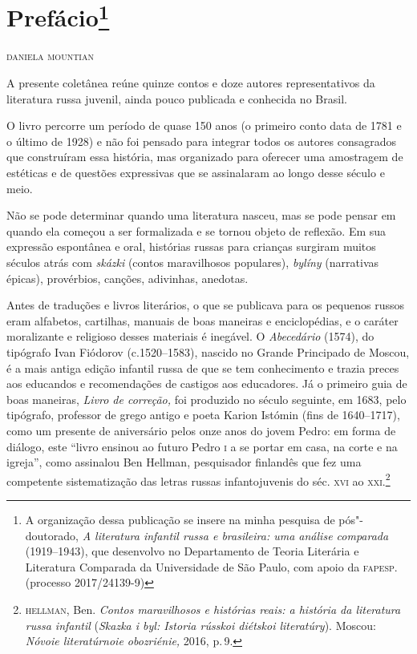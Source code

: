 \chapter{Prefácio\footnote{A
  organização dessa publicação se insere na minha pesquisa de
  pós"-doutorado, \emph{A literatura infantil russa e brasileira: uma
  análise comparada} (1919--1943), que desenvolvo no Departamento
  de Teoria Literária e Literatura Comparada da Universidade de São
  Paulo, com apoio da \textsc{fapesp}.(processo 2017/24139-9)}} \label{part0}

\begingroup\small
\begin{flushright}
\hfill\textsc{daniela mountian}
\end{flushright}


A presente coletânea reúne quinze contos e doze autores representativos da
literatura russa juvenil, ainda pouco publicada e conhecida
no Brasil.

O livro percorre um período de quase 150 anos (o primeiro conto data de
1781 e o último de 1928) e não foi pensado para integrar todos os
autores consagrados que construíram essa história, mas organizado para
oferecer uma amostragem de estéticas e de questões expressivas que se
assinalaram ao longo desse século e meio.

Não se pode determinar quando uma literatura nasceu, mas se pode pensar
em quando ela começou a ser formalizada e se tornou objeto de reflexão.
Em sua expressão espontânea e oral, histórias russas para crianças
surgiram muitos séculos atrás com \emph{skázki} (contos maravilhosos
populares), \emph{bylíny} (narrativas épicas), provérbios,
canções, adivinhas, anedotas.

Antes de traduções e livros literários, o que se publicava para os
pequenos russos eram alfabetos, cartilhas, manuais de boas maneiras e
enciclopédias, e o caráter moralizante e religioso desses materiais é
inegável. O \emph{Abecedário} (1574), do tipógrafo Ivan Fiódorov
(c.1520--1583), nascido no Grande Principado de Moscou, é a mais antiga
edição infantil russa de que se tem conhecimento e trazia preces aos
educandos e recomendações de castigos aos educadores. Já o primeiro guia
de boas maneiras, \emph{Livro de correção,} foi produzido no século
seguinte, em 1683, pelo tipógrafo, professor de grego antigo e poeta
Karion Istómin (fins de 1640--1717), como um presente de aniversário
pelos onze anos do jovem Pedro: em forma de diálogo, este ``livro
ensinou ao futuro Pedro \textsc{i} a se portar em casa, na corte e na igreja'',
como assinalou Ben Hellman, pesquisador finlandês que fez uma competente
sistematização das letras russas infantojuvenis do séc. \textsc{xvi} ao
\textsc{xxi}.\footnote{\textsc{hellman}, Ben. \emph{Contos maravilhosos e histórias reais:
  a história da literatura russa infantil} (\emph{Skazka i byl: Istoria
  rússkoi diétskoi literatúry}). Moscou: \emph{Nóvoie
  literatúrnoie obozriénie,} 2016, p.\,9.}

